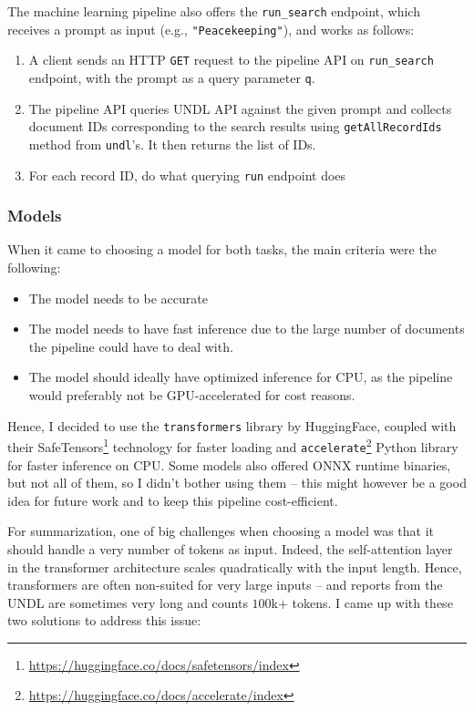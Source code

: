 The machine learning pipeline also offers the \texttt{run\_search} endpoint, which receives a prompt as input (e.g., \texttt{"Peacekeeping"}), and works as follows:

\begin{enumerate}
    \item A client sends an HTTP \texttt{GET} request to the pipeline API on \texttt{run\_search} endpoint, with the prompt as a query parameter \texttt{q}.
    \item The pipeline API queries UNDL API against the given prompt and collects document IDs corresponding to the search results using \texttt{getAllRecordIds} method from \texttt{undl}'s. It then returns the list of IDs.
    \item For each record ID, do what querying \texttt{run} endpoint does
\end{enumerate}

\subsubsection{Models} \label{sssec:models}

When it came to choosing a model for both tasks, the main criteria were the following:
\begin{itemize}
    \item The model needs to be accurate
    \item The model needs to have fast inference due to the large number of documents the pipeline could have to deal with.
    \item The model should ideally have optimized inference for CPU, as the pipeline would preferably not be GPU-accelerated for cost reasons.
\end{itemize}

Hence, I decided to use the \texttt{transformers} library by HuggingFace, coupled with their SafeTensors\footnote{\url{https://huggingface.co/docs/safetensors/index}} technology for faster loading and \texttt{accelerate}\footnote{\url{https://huggingface.co/docs/accelerate/index}} Python library for faster inference on CPU. Some models also offered ONNX runtime binaries, but not all of them, so I didn't bother using them – this might however be a good idea for future work and to keep this pipeline cost-efficient.

For summarization, one of big challenges when choosing a model was that it should handle a very number of tokens as input. Indeed, the self-attention layer in the transformer architecture scales quadratically with the input length. Hence, transformers are often non-suited for very large inputs – and reports from the UNDL are sometimes very long and counts $100$k+ tokens. I came up with these two solutions to address this issue:

